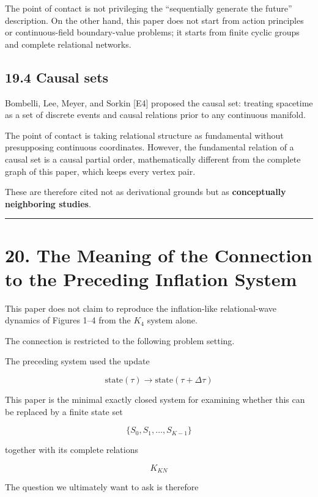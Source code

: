 \documentclass[
  a4paper,
]{article}
\begin{document}
The point of contact is not privileging the ``sequentially generate the
future'' description. On the other hand, this paper does not start from
action principles or continuous-field boundary-value problems; it starts
from finite cyclic groups and complete relational networks.

\subsection{19.4 Causal sets}\label{causal-sets}

Bombelli, Lee, Meyer, and Sorkin {[}E4{]} proposed the causal set:
treating spacetime as a set of discrete events and causal relations
prior to any continuous manifold.

The point of contact is taking relational structure as fundamental
without presupposing continuous coordinates. However, the fundamental
relation of a causal set is a causal partial order, mathematically
different from the complete graph of this paper, which keeps every
vertex pair.

These are therefore cited not as derivational grounds but as
\textbf{conceptually neighboring studies}.

\begin{center}\rule{0.5\linewidth}{0.5pt}\end{center}

\section{20. The Meaning of the Connection to the Preceding Inflation
System}\label{the-meaning-of-the-connection-to-the-preceding-inflation-system}

This paper does not claim to reproduce the inflation-like
relational-wave dynamics of Figures 1--4 from the \(K_4\) system alone.

The connection is restricted to the following problem setting.

The preceding system used the update

\[
\text{state}(\tau)
\to
\text{state}(\tau+\Delta\tau)
\]

This paper is the minimal exactly closed system for examining whether
this can be replaced by a finite state set

\[
\{S_0,S_1,\ldots,S_{K-1}\}
\]

together with its complete relations

\[
K_{KN}
\]

The question we ultimately want to ask is therefore
\end{document}
